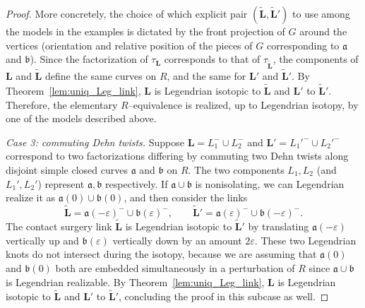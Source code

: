 \documentclass{amsart}
\numberwithin{equation}{section}
\numberwithin{figure}{section}
\theoremstyle{definition}
\theoremstyle{remark}
\let\oldtau\tau
\renewcommand{\tau}{\oldtau}
\renewcommand{\aa}{\mathfrak{a}}
\newcommand{\bb}{\mathfrak{b}}
\begin{document}
\begin{proof}
  More concretely, the choice of which explicit pair $(\widetilde{\boldsymbol{L}},\widetilde{\boldsymbol{L}}')$ to use among the models in the examples is dictated by the front projection of $G$ around the vertices (orientation and relative position of the pieces of $G$ corresponding to $\aa$ and $\bb$).  
  Since the factorization of $\tau_{\scriptscriptstyle{\boldsymbol{L}}}$ corresponds to that of $\tau_{\scriptscriptstyle{\widetilde{\boldsymbol{L}}}}$, the components of $\boldsymbol{L}$ and $\widetilde{\boldsymbol{L}}$ define the same curves on $R$, and the same for $\boldsymbol{L}'$ and $\widetilde{\boldsymbol{L}}'$. By Theorem~\ref{lem:uniq_Leg_link}, $\boldsymbol{L}$ is Legendrian isotopic to $\widetilde{\boldsymbol{L}}$ and $\boldsymbol{L}'$ to $\widetilde{\boldsymbol{L}}'$. Therefore, the elementary $R$–equivalence is realized, up to Legendrian isotopy, by one of the models described above.

  \medskip\noindent
  \emph{Case 3: commuting Dehn twists.}  
  Suppose $\boldsymbol{L}=L_1^-\cup L_2^-$ and $\boldsymbol{L}'=L_1'^-\cup L_2'^-$ correspond to two factorizations differing by commuting two Dehn twists along disjoint simple closed curves $\aa$ and $\bb$ on $R$. The two components $L_1,L_2$ (and $L_1',L_2'$) represent $\aa,\bb$ respectively.
  If $\aa\cup\bb$ is nonisolating, we can Legendrian realize it as $\aa(0)\cup\bb(0)$, and then consider the links
  \[
    \widetilde{\boldsymbol{L}} = \aa(-\varepsilon)^-\cup \bb(\varepsilon)^-,
    \qquad
    \widetilde{\boldsymbol{L}}' = \aa(\varepsilon)^-\cup \bb(-\varepsilon)^-.
  \]
  The contact surgery link $\boldsymbol{\widetilde{L}}$ is Legendrian isotopic to $\boldsymbol{\widetilde{L}}'$ by translating $\aa(-\varepsilon)$ vertically up and $\bb(\varepsilon)$ vertically down by an amount $2\varepsilon$. These two Legendrian knots do not intersect during the isotopy, because we are assuming that $\aa(0)$ and $\bb(0)$ both are embedded simultaneously in a perturbation of $R$ since $\aa\cup\bb$ is Legendrian realizable. By Theorem~\ref{lem:uniq_Leg_link}, $\boldsymbol{L}$ is Legendrian isotopic to $\widetilde{\boldsymbol{L}}$ and $\boldsymbol{L}'$ to $\widetilde{\boldsymbol{L}}'$, concluding the proof in this subcase as well.


\end{proof}
\end{document}
